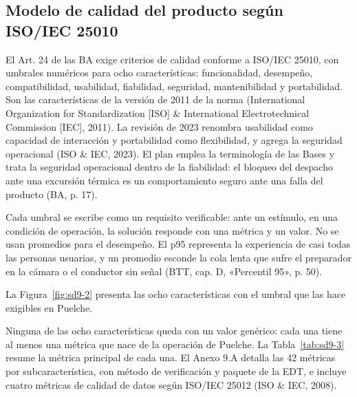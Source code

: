 \subsection{Modelo de calidad del producto según ISO/IEC 25010}

El Art. 24 de las BA exige criterios de calidad conforme a ISO/IEC 25010, con umbrales numéricos para ocho características: funcionalidad, desempeño, compatibilidad, usabilidad, fiabilidad, seguridad, mantenibilidad y portabilidad. Son las características de la versión de 2011 de la norma (International Organization for Standardization [ISO] \& International Electrotechnical Commission [IEC], 2011). La revisión de 2023 renombra usabilidad como capacidad de interacción y portabilidad como flexibilidad, y agrega la seguridad operacional (ISO \& IEC, 2023). El plan emplea la terminología de las Bases y trata la seguridad operacional dentro de la fiabilidad: el bloqueo del despacho ante una excursión térmica es un comportamiento seguro ante una falla del producto (BA, p. 17).

Cada umbral se escribe como un requisito verificable: ante un estímulo, en una condición de operación, la solución responde con una métrica y un valor. No se usan promedios para el desempeño. El p95 representa la experiencia de casi todas las personas usuarias, y un promedio esconde la cola lenta que sufre el preparador en la cámara o el conductor sin señal (BTT, cap. D, «Percentil 95», p. 50).

La Figura~\ref{fig:sd9-2} presenta las ocho características con el umbral que las hace exigibles en Puelche.


Ninguna de las ocho características queda con un valor genérico: cada una tiene al menos una métrica que nace de la operación de Puelche. La Tabla~\ref{tab:sd9-3} resume la métrica principal de cada una. El Anexo 9.A detalla las 42 métricas por subcaracterística, con método de verificación y paquete de la EDT, e incluye cuatro métricas de calidad de datos según ISO/IEC 25012 (ISO \& IEC, 2008).

